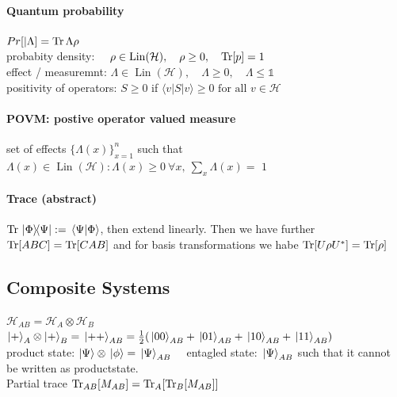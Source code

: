 \paragraph{Quantum probability}
$Pr[|\Lambda] = \Trace{\Lambda \rho} $\\
probabity density: $\quad \rho \in \operatorname{Lin}(\mathcal{H}), \quad \rho \geq 0, \quad \Trace[p] =1$\\
effect / measuremnt: $\Lambda \in \operatorname{Lin}(\mathcal{H}), \quad \Lambda \geq 0, \quad \Lambda \leq \mathbb{1}$\\

positivity of operators: $S \geq 0$ if $\langle v|S| v\rangle \geq 0 \text { for all } v \in \mathcal{H}$

\paragraph{POVM: postive operator valued measure} set of effects $\{ \Lambda (x)\}^n_{x=1}$ such that
$\Lambda(x) \in \operatorname{Lin}(\mathcal{H}) : \Lambda(x) \geq 0 \ \forall x, \ \sum_x \Lambda(x) =$ $1$

\paragraph{Trace (abstract)} $\Trace{\ketbra*{\Phi}{\Psi}} := \braket*{\Psi}{\Phi}$, then extend linearly. Then we have further\\
$\Trace[ABC]= \Trace[CAB]$ and for basis transformations we habe $\Tr[U \rho U^* ]= \Tr[\rho]$\\

\subsection{Composite Systems} 
$\mathcal{H}_{AB} = \mathcal{H}_A \otimes \mathcal{H}_B$\\
$\ket{+}_A\otimes \ket{+}_B = \ket*{++}_{AB} = \frac{1}{2} (\ket*{00}_{AB}+ \ket*{01}_{AB}+ \ket*{10}_{AB}+\ket*{11}_{AB})$\\
product state: $\ket{\Psi}\otimes \ket*{\phi} = \ket*{\Psi}_{AB} \quad$ entagled state: $\ket*{\Psi}_{AB}$ such that it cannot be written as productstate.\\
Partial trace $\Tr_{AB}[M_{AB}] = \Tr_A[\Tr_B[M_{AB}]]$

